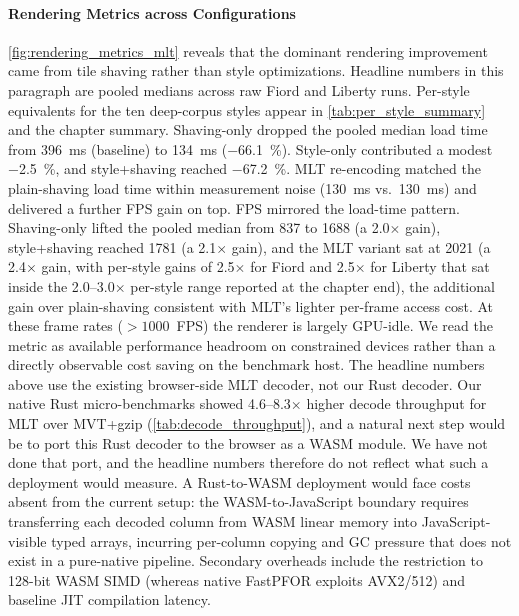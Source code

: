 \paragraph{Rendering Metrics across Configurations}
\cref{fig:rendering_metrics_mlt} reveals that the dominant rendering improvement came from tile shaving rather than style optimizations.
Headline numbers in this paragraph are pooled medians across raw Fiord and Liberty runs.
Per-style equivalents for the ten deep-corpus styles appear in \cref{tab:per_style_summary} and the chapter summary.
Shaving-only dropped the pooled median load time from \qty{396}{\milli\second} (baseline) to \qty{134}{\milli\second} (\qty{-66.1}{\percent}).
Style-only contributed a modest \qty{-2.5}{\percent}, and style+shaving reached \qty{-67.2}{\percent}.
\ac{MLT} re-encoding matched the plain-shaving load time within measurement noise (\qty{130}{\milli\second} vs.\ \qty{130}{\milli\second}) and delivered a further \ac{FPS} gain on top.
\ac{FPS} mirrored the load-time pattern.
Shaving-only lifted the pooled median from \num{837} to \num{1688} (a \num{2.0}$\times$ gain), style+shaving reached \num{1781} (a \num{2.1}$\times$ gain), and the \ac{MLT} variant sat at \num{2021} (a \num{2.4}$\times$ gain, with per-style gains of \num{2.5}$\times$ for Fiord and \num{2.5}$\times$ for Liberty that sat inside the \numrange{2.0}{3.0}$\times$ per-style range reported at the chapter end), the additional gain over plain-shaving consistent with \ac{MLT}'s lighter per-frame access cost.
At these frame rates ($>{1000}$~\ac{FPS}) the renderer is largely \ac{GPU}-idle.
We read the metric as available performance headroom on constrained devices rather than a directly observable cost saving on the benchmark host.
The headline numbers above use the existing browser-side \ac{MLT} decoder, not our Rust decoder.
Our native Rust micro-benchmarks showed \numrange{4.6}{8.3}$\times$ higher decode throughput for \ac{MLT} over \ac{MVT}+gzip (\cref{tab:decode_throughput}), and a natural next step would be to port this Rust decoder to the browser as a \ac{WASM} module. We have not done that port, and the headline numbers therefore do not reflect what such a deployment would measure.
A Rust-to-\ac{WASM} deployment would face costs absent from the current setup: the \ac{WASM}-to-JavaScript boundary requires transferring each decoded column from \ac{WASM} linear memory into JavaScript-visible typed arrays, incurring per-column copying and \ac{GC} pressure that does not exist in a pure-native pipeline.
Secondary overheads include the restriction to 128-bit \ac{WASM} \ac{SIMD} (whereas native \ac{FastPFOR} exploits AVX2/512) and baseline JIT compilation latency.
